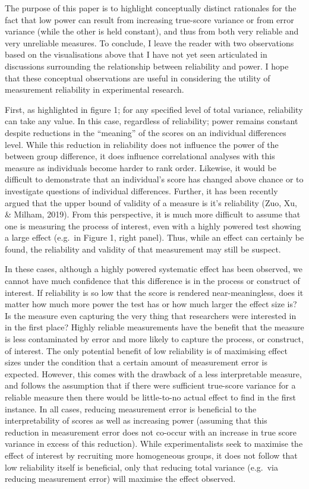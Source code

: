 \documentclass[english,,man]{apa6}
\begin{document}
The purpose of this paper is to highlight conceptually distinct rationales for the fact that low power can result from increasing true-score variance or from error variance (while the other is held constant), and thus from both very reliable and very unreliable measures. To conclude, I leave the reader with two observations based on the visualisations above that I have not yet seen articulated in discussions surrounding the relationship between reliability and power. I hope that these conceptual observations are useful in considering the utility of measurement reliability in experimental research.

First, as highlighted in figure 1; for any specified level of total variance, reliability can take any value. In this case, regardless of reliability; power remains constant despite reductions in the \enquote{meaning} of the scores on an individual differences level. While this reduction in reliability does not influence the power of the between group difference, it does influence correlational analyses with this measure as individuals become harder to rank order. Likewise, it would be difficult to demonstrate that an individual's score has changed above chance or to investigate questions of individual differences. Further, it has been recently argued that the upper bound of validity of a measure is it's reliability (Zuo, Xu, \& Milham, 2019). From this perspective, it is much more difficult to assume that one is measuring the process of interest, even with a highly powered test showing a large effect (e.g.~in Figure 1, right panel). Thus, while an effect can certainly be found, the reliability and validity of that measurement may still be suspect.

In these cases, although a highly powered systematic effect has been observed, we cannot have much confidence that this difference is in the process or construct of interest. If reliability is so low that the score is rendered near-meaningless, does it matter how much more power the test has or how much larger the effect size is? Is the measure even capturing the very thing that researchers were interested in in the first place? Highly reliable measurements have the benefit that the measure is less contaminated by error and more likely to capture the process, or construct, of interest. The only potential benefit of low reliability is of maximising effect sizes under the condition that a certain amount of measurement error is expected. However, this comes with the drawback of a less interpretable measure, and follows the assumption that if there were sufficient true-score variance for a reliable measure then there would be little-to-no actual effect to find in the first instance. In all cases, reducing measurement error is beneficial to the interpretability of scores as well as increasing power (assuming that this reduction in measurement error does not co-occur with an increase in true score variance in excess of this reduction). While experimentalists seek to maximise the effect of interest by recruiting more homogeneous groups, it does not follow that low reliability itself is beneficial, only that reducing total variance (e.g.~via reducing measurement error) will maximise the effect observed.
\end{document}
